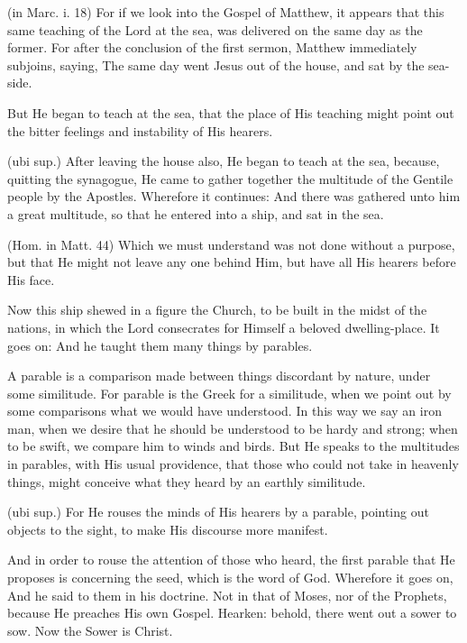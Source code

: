  (in Marc. i. 18) For if we look into the Gospel of Matthew, it appears that this same teaching of the Lord at the sea, was delivered on the same day as the former. For after the conclusion of the first sermon, Matthew immediately subjoins, saying, The same day went Jesus out of the house, and sat by the sea-side.

 But He began to teach at the sea, that the place of His teaching might point out the bitter feelings and instability of His hearers.

 (ubi sup.) After leaving the house also, He began to teach at the sea, because, quitting the synagogue, He came to gather together the multitude of the Gentile people by the Apostles. Wherefore it continues: And there was gathered unto him a great multitude, so that he entered into a ship, and sat in the sea.

 (Hom. in Matt. 44) Which we must understand was not done without a purpose, but that He might not leave any one behind Him, but have all His hearers before His face.

 Now this ship shewed in a figure the Church, to be built in the midst of the nations, in which the Lord consecrates for Himself a beloved dwelling-place. It goes on: And he taught them many things by parables.

 A parable is a comparison made between things discordant by nature, under some similitude. For parable is the Greek for a similitude, when we point out by some comparisons what we would have understood. In this way we say an iron man, when we desire that he should be understood to be hardy and strong; when to be swift, we compare him to winds and birds. But He speaks to the multitudes in parables, with His usual providence, that those who could not take in heavenly things, might conceive what they heard by an earthly similitude.

 (ubi sup.) For He rouses the minds of His hearers by a parable, pointing out objects to the sight, to make His discourse more manifest.

 And in order to rouse the attention of those who heard, the first parable that He proposes is concerning the seed, which is the word of God. Wherefore it goes on, And he said to them in his doctrine. Not in that of Moses, nor of the Prophets, because He preaches His own Gospel. Hearken: behold, there went out a sower to sow. Now the Sower is Christ.

